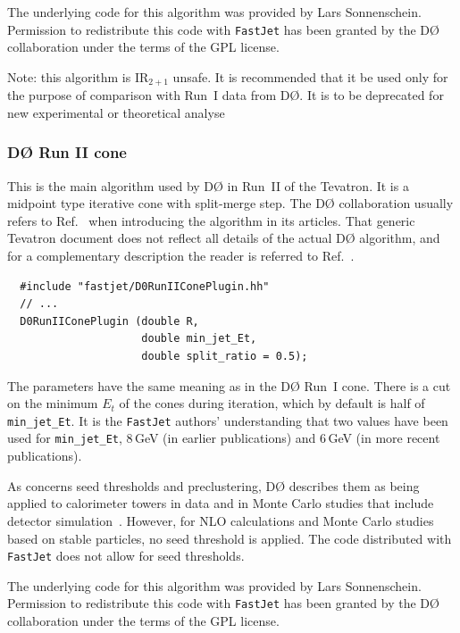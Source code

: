 \documentclass[12pt,a4]{article}
\newcommand{\fastjet}{\texttt{FastJet}\xspace}
\newcommand{\Dzero}{D\O\xspace}
\begin{document}
The underlying code for this algorithm was provided by
Lars Sonnenschein.
%
Permission to redistribute this code with \fastjet has been granted by
the \Dzero collaboration under the terms of the GPL license.



Note: this algorithm is IR$_{2+1}$ unsafe. It is recommended that it
be used only for the purpose of comparison with Run~I data from
\Dzero.
%
It is to be deprecated for new experimental or theoretical analyse

\subsubsection{\Dzero Run II cone}
%
This is the main algorithm used by \Dzero in Run~II of the
Tevatron. It is a midpoint type iterative cone with split-merge step.
%
The \Dzero collaboration usually refers to
Ref.~\cite{RunII-jet-physics} when introducing the algorithm in its
articles.
%
That generic Tevatron document does not reflect all details of the
actual \Dzero algorithm, and for a complementary description
%
the reader is referred to Ref.~\cite{arXiv:1110.3771}.
\begin{lstlisting}
  #include "fastjet/D0RunIIConePlugin.hh"
  // ...
  D0RunIIConePlugin (double R, 
                     double min_jet_Et, 
                     double split_ratio = 0.5);
\end{lstlisting}
The parameters have the same meaning as in the \Dzero Run~I
cone. 
%
There is a cut on the minimum $E_t$ of the cones during iteration,
which by default is half of \verb|min_jet_Et|.
%
It is the \fastjet authors' understanding that two values have been
used for \verb|min_jet_Et|, 8\,GeV (in earlier publications) and
6\,GeV (in more recent publications).

As concerns seed thresholds and preclustering, \Dzero describes them
as being applied to calorimeter towers in data and in Monte Carlo studies
that include detector simulation~\cite{arXiv:1110.3771}.
%
However, for NLO calculations and Monte Carlo studies based on stable
particles, no seed threshold is applied.
%
The code distributed with \fastjet does not allow for seed thresholds.

The underlying code for this algorithm was provided by
Lars Sonnenschein.
%
Permission to redistribute this code with \fastjet has been granted by
the \Dzero collaboration under the terms of the GPL license.
\end{document}
